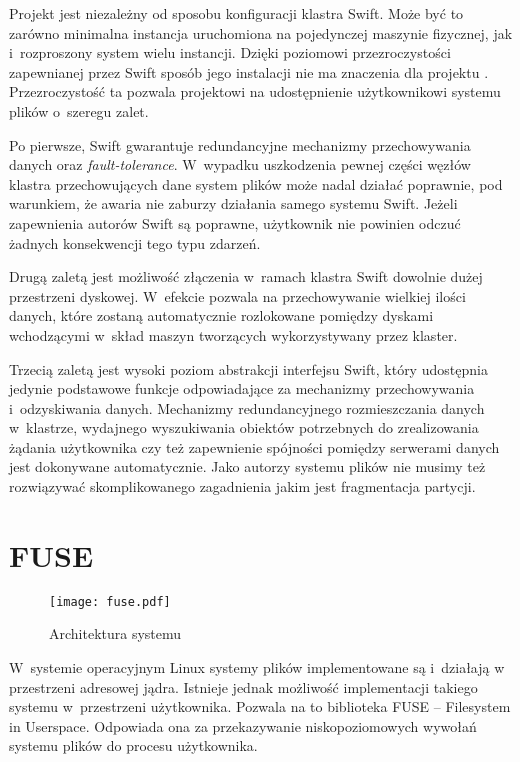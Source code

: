 Projekt \cb{} jest niezależny od sposobu konfiguracji klastra Swift. Może być to
zarówno minimalna instancja uruchomiona na pojedynczej maszynie fizycznej, jak
i~rozproszony system wielu instancji. Dzięki poziomowi przezroczystości
zapewnianej przez Swift sposób jego instalacji nie ma znaczenia dla projektu
\cb{}. Przezroczystość ta pozwala projektowi \cb{} na udostępnienie
użytkownikowi systemu plików o~szeregu zalet.

Po pierwsze, Swift gwarantuje redundancyjne mechanizmy przechowywania danych
oraz \textit{fault-tolerance}. W~wypadku uszkodzenia pewnej części węzłów
klastra przechowujących dane system plików \cb{} może nadal działać poprawnie,
pod warunkiem, że awaria nie zaburzy działania samego systemu Swift. Jeżeli
zapewnienia autorów Swift są poprawne, użytkownik nie powinien odczuć żadnych
konsekwencji tego typu zdarzeń.

Drugą zaletą jest możliwość złączenia w~ramach klastra Swift dowolnie dużej
przestrzeni dyskowej. W~efekcie \cb{} pozwala na przechowywanie wielkiej ilości
danych, które zostaną automatycznie rozlokowane pomiędzy dyskami wchodzącymi
w~skład maszyn tworzących wykorzystywany przez \cb{} klaster.

Trzecią zaletą jest wysoki poziom abstrakcji interfejsu Swift, który udostępnia
jedynie podstawowe funkcje odpowiadające za mechanizmy przechowywania
i~odzyskiwania danych. Mechanizmy redundancyjnego rozmieszczania danych
w~klastrze, wydajnego wyszukiwania obiektów potrzebnych do zrealizowania żądania
użytkownika czy też zapewnienie spójności pomiędzy serwerami danych jest
dokonywane automatycznie. Jako autorzy systemu plików nie musimy też rozwiązywać
skomplikowanego zagadnienia jakim jest fragmentacja partycji.

\section{FUSE}

\begin{figure}
	\centering
	\texttt{[image: fuse.pdf]}
	\caption{Architektura systemu}
	\label{fig:fuse}
\end{figure}

W~systemie operacyjnym Linux systemy plików implementowane są i~działają w
przestrzeni adresowej jądra. Istnieje jednak możliwość implementacji takiego
systemu w~przestrzeni użytkownika. Pozwala na to biblioteka FUSE -- Filesystem
in Userspace. Odpowiada ona za przekazywanie niskopoziomowych wywołań systemu
plików do procesu użytkownika.

